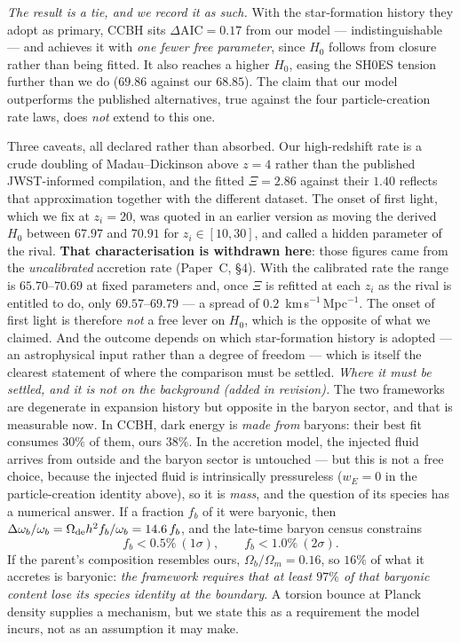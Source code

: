\documentclass[11pt]{article}
\begin{document}
\emph{The result is a tie, and we record it as such.} With the star-formation history they adopt
as primary, CCBH sits $\Delta\mathrm{AIC} = 0.17$ from our model --- indistinguishable --- and
achieves it with \emph{one fewer free parameter}, since $H_0$ follows from closure rather than
being fitted. It also reaches a higher $H_0$, easing the SH0ES tension further than we do
($69.86$ against our $68.85$). The claim that our model outperforms the published alternatives,
true against the four particle-creation rate laws, does \emph{not} extend to this one.

Three caveats, all declared rather than absorbed. Our high-redshift rate is a crude doubling of
Madau--Dickinson above $z = 4$ rather than the published JWST-informed compilation, and the fitted
$\Xi = 2.86$ against their $1.40$ reflects that approximation together with the different dataset.
The onset of first light, which we fix at $z_i = 20$, was quoted in an earlier version as moving the derived $H_0$ between $67.97$ and $70.91$ for $z_i \in [10,30]$, and called a hidden parameter of the rival. \textbf{That characterisation is withdrawn here}: those figures came from the \emph{uncalibrated} accretion rate (Paper~C, \S4). With the calibrated rate the range is $65.70$--$70.69$ at fixed parameters and, once $\Xi$ is refitted at each $z_i$ as the rival is entitled to do, only $69.57$--$69.79$ --- a spread of $0.2$~km\,s$^{-1}$\,Mpc$^{-1}$. The onset of first light is therefore \emph{not} a free lever on $H_0$, which is the opposite of what we claimed. And the
outcome depends on which star-formation history is adopted --- an astrophysical input rather than a
degree of freedom --- which is itself the clearest statement of where the comparison must be
settled. \emph{Where it must be settled, and it is not on the background
(added in revision).} The two frameworks are degenerate in expansion history but opposite in the
baryon sector, and that is measurable now. In CCBH, dark energy is \emph{made from} baryons: their
best fit consumes $30\%$ of them, ours $38\%$. In the accretion model, the injected fluid arrives
from outside and the baryon sector is untouched --- but this is not a free choice, because the
injected fluid is intrinsically pressureless ($w_E = 0$ in the particle-creation identity above),
so it is \emph{mass}, and the question of its species has a numerical answer. If a fraction $f_b$
of it were baryonic, then
$\Delta\omega_b/\omega_b = \Omega_{\rm de}h^2 f_b/\omega_b = 14.6\,f_b$, and the late-time baryon
census constrains
\[
f_b < 0.5\% \ (1\sigma), \qquad f_b < 1.0\% \ (2\sigma).
\]
If the parent's composition resembles ours, $\Omega_b/\Omega_m = 0.16$, so $16\%$ of what it
accretes is baryonic: \emph{the framework requires that at least $97\%$ of that baryonic content
lose its species identity at the boundary}. A torsion bounce at Planck density supplies a
mechanism, but we state this as a requirement the model incurs, not as an assumption it may make.
\end{document}
